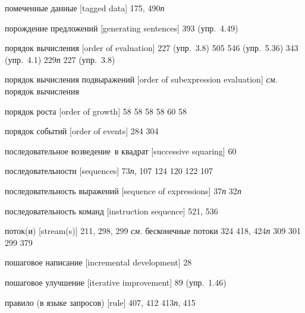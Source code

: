 \begin{theindex}
\item {помеченные данные [tagged data]} 175, 490{\it п}
\item {порождение предложений [generating sentences]} 393 (упр.~4.49)
\item {порядок вычисления [order of evaluation]}
   227 (упр.~3.8)
   505
   546 (упр.~5.36)
   343 (упр.~4.1)
   229{\it п}
   227 (упр.~3.8)
\item {порядок вычисления подвыражений [order of subexpression evaluation]} {\it см.} порядок вычисления
\item {порядок роста [order of growth]} 58
   58
   58
   58
   60
   58
\item {порядок событий [order of events]}
   284
   304
\item {последовательное возведение~в квадрат [successive squaring]} 60
\item {последовательности [sequences]} 73{\it п}, 107
   124
   120
   122
   107
\item {последовательность выражений [sequence of expressions]}
   37{\it п}
   32{\it п}
\item {последовательность команд [instruction sequence]} 521, 536
\item {поток(и) [stream(s)]} 211, 298, 299
   {\it см.} бесконечные потоки
   324
   418, 424{\it п}
   309
   301
   299
   379
\item {пошаговое написание [incremental development]} 28
\item {пошаговое улучшение [iterative improvement]} 89 (упр.~1.46)
\item {правило (в языке запросов) [rule]} 407, 412
   413{\it п}, 415

\end{theindex}
